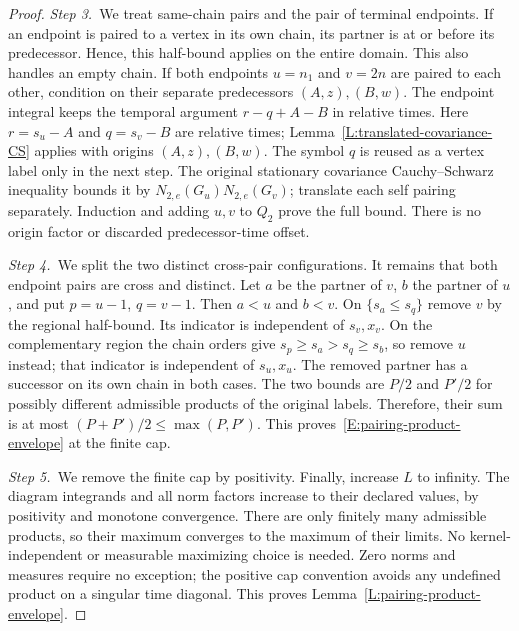 \documentclass[12pt,oneside,openany]{book}
\numberwithin{equation}{section}
\theoremstyle{nogostyle}
\theoremstyle{definition}
\begin{document}
\begin{proof}
  \medskip
  \noindent\textit{Step 3.~}We treat same-chain pairs and the pair of terminal
  endpoints.
  If an endpoint is paired to a vertex in its own chain, its partner is at or
  before its predecessor. Hence, this half-bound applies on the entire domain.
  This also handles an empty chain. If both endpoints $u = n_1$ and $v = 2n$ are
  paired to each other, condition on their separate predecessors $(A,z),(B,w)$.
  The endpoint integral keeps the temporal argument $r-q+A-B$ in relative times.
  Here $r=s_u-A$ and $q=s_v-B$ are relative times;
  Lemma~\ref{L:translated-covariance-CS} applies with origins $(A,z),(B,w)$.
  The symbol $q$ is reused as a vertex label only in the next step.
  The original stationary covariance Cauchy--Schwarz inequality bounds it by
  $N_{2,e}(G_u)N_{2,e}(G_v)$; translate each self pairing separately. Induction
  and adding $u,v$ to $Q_2$ prove the full bound. There is no origin factor or
  discarded predecessor-time offset.


  \medskip
  \noindent\textit{Step 4.~}We split the two distinct cross-pair
  configurations.
  It remains that both endpoint pairs are cross and distinct. Let $a$ be the
  partner of $v$, $b$ the partner of $u$, and put $p = u-1$, $q = v-1$. Then $a
  < u$ and $b < v$. On $\{s_a\le s_q\}$ remove $v$ by the regional half-bound.
  Its indicator is independent of $s_v,x_v$. On the complementary region the
  chain orders give $s_p \ge s_a > s_q \ge s_b$, so remove $u$ instead; that
  indicator is independent of $s_u,x_u$. The removed partner has a successor on
  its own chain in both cases. The two bounds are $P/2$ and $P'/2$ for possibly
  different admissible products of the original labels. Therefore, their sum is
  at most $(P+P')/2 \le \max(P,P')$. This
  proves~\eqref{E:pairing-product-envelope} at the finite cap.



  \medskip
  \noindent\textit{Step 5.~}We remove the finite cap by positivity.
  Finally, increase $L$ to infinity. The diagram integrands and all norm factors
  increase to their declared values, by positivity and monotone convergence.
  There are only finitely many admissible products, so their maximum converges
  to the maximum of their limits. No kernel-independent or measurable maximizing
  choice is needed. Zero norms and measures require no exception; the positive
  cap convention avoids any undefined product on a singular time diagonal. This
  proves Lemma~\ref{L:pairing-product-envelope}.
\end{proof}
\end{document}

